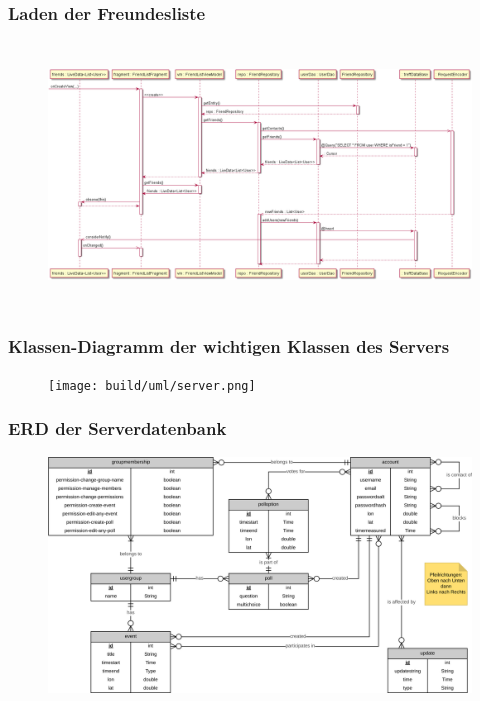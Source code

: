 \documentclass[aspectratio=1610]{beamer}
\begin{document}
    \begin{frame}[plain]
        \frametitle{Laden der Freundesliste}
        \begin{figure}[!htb]
            \centering
            \includegraphics[height = 200pt]{images/datafetch.png}
        \end{figure}
    \end{frame}


	\begin{frame}[plain]
        \frametitle{Klassen-Diagramm der wichtigen Klassen des Servers}
        \begin{figure}[!htb]
            \centering
            \texttt{[image: build/uml/server.png]}
        \end{figure}
	\end{frame}

	\begin{frame}[plain]
        \frametitle{ERD der Serverdatenbank}
        \begin{figure}[!htb]
            \centering
            \includegraphics[width = \columnwidth]{images/erd-complete.png}
        \end{figure}
    \end{frame}
\end{document}
